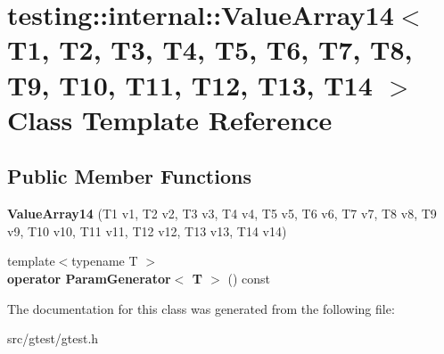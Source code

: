 \hypertarget{classtesting_1_1internal_1_1_value_array14}{}\section{testing\+:\+:internal\+:\+:Value\+Array14$<$ T1, T2, T3, T4, T5, T6, T7, T8, T9, T10, T11, T12, T13, T14 $>$ Class Template Reference}
\label{classtesting_1_1internal_1_1_value_array14}
\subsection*{Public Member Functions}
\begin{DoxyCompactItemize}
\item 
\mbox{\label{classtesting_1_1internal_1_1_value_array14_a07a09d64aba1260d403adc661546ce48}} 
{\bfseries Value\+Array14} (T1 v1, T2 v2, T3 v3, T4 v4, T5 v5, T6 v6, T7 v7, T8 v8, T9 v9, T10 v10, T11 v11, T12 v12, T13 v13, T14 v14)
\item 
\mbox{\label{classtesting_1_1internal_1_1_value_array14_aef77c9d7520c7313e2af66fd79185698}} 
{\footnotesize template$<$typename T $>$ }\\{\bfseries operator Param\+Generator$<$ T $>$} () const
\end{DoxyCompactItemize}


The documentation for this class was generated from the following file\+:\begin{DoxyCompactItemize}
\item 
src/gtest/gtest.\+h\end{DoxyCompactItemize}
